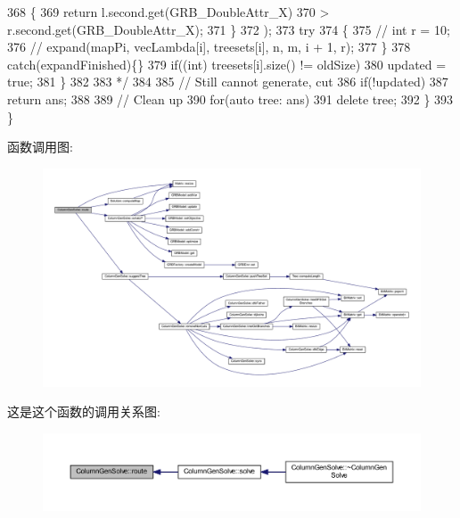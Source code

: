 \begin{DoxyCode}
368 \textcolor{comment}{                    \{}
369 \textcolor{comment}{                        return l.second.get(GRB\_DoubleAttr\_X)}
370 \textcolor{comment}{                            > r.second.get(GRB\_DoubleAttr\_X);}
371 \textcolor{comment}{                    \}}
372 \textcolor{comment}{                );}
373 \textcolor{comment}{                try}
374 \textcolor{comment}{                \{}
375 \textcolor{comment}{                    // int r = 10;}
376 \textcolor{comment}{                    // expand(mapPi, vecLambda[i], treesets[i], n, m, i + 1, r);}
377 \textcolor{comment}{                \}}
378 \textcolor{comment}{                catch(expandFinished)\{\}}
379 \textcolor{comment}{                if((int) treesets[i].size() != oldSize)}
380 \textcolor{comment}{                    updated = true;}
381 \textcolor{comment}{            \}}
382 \textcolor{comment}{            }
383 \textcolor{comment}{        */}
384         
385         \textcolor{comment}{// Still cannot generate, cut}
386         \textcolor{keywordflow}{if}(!updated)
387             \textcolor{keywordflow}{return} ans;
388         
389         \textcolor{comment}{// Clean up}
390         \textcolor{keywordflow}{for}(\textcolor{keyword}{auto} tree: ans)
391             \textcolor{keyword}{delete} tree;
392     \}
393 \}
\end{DoxyCode}


函数调用图\+:
\nopagebreak
\begin{figure}[H]
\begin{center}
\leavevmode
\includegraphics[width=350pt]{classColumnGenSolve_af97cd5f1c4a7305b72e46971fdb85002_cgraph}
\end{center}
\end{figure}




这是这个函数的调用关系图\+:
\nopagebreak
\begin{figure}[H]
\begin{center}
\leavevmode
\includegraphics[width=350pt]{classColumnGenSolve_af97cd5f1c4a7305b72e46971fdb85002_icgraph}
\end{center}
\end{figure}



